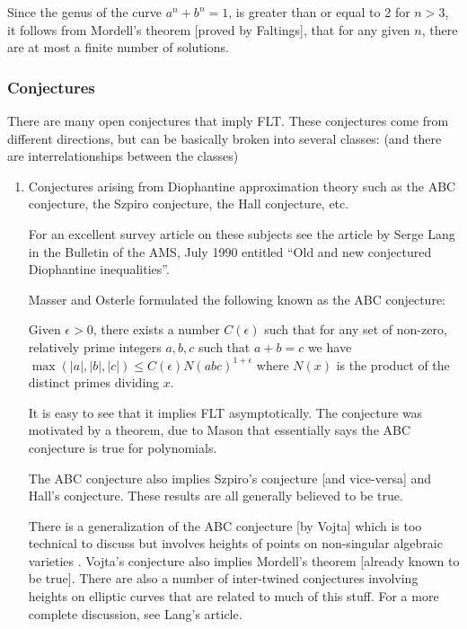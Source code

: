 {  Since the genus of the curve $a^n + b^n = 1$, is greater than or equal
  to 2 for $n > 3$, it follows from Mordell's theorem [proved by
  Faltings], that for any given $n$, there are at most a finite number
  of solutions.


  \subsubsection{Conjectures}

  There are many open conjectures that imply FLT. These conjectures come
  from different directions, but can be basically broken into several
  classes: (and there are interrelationships between the classes)

  \begin{enumerate}
    \item Conjectures arising from Diophantine approximation theory such
    as the ABC conjecture, the Szpiro conjecture, the Hall conjecture,
    etc.

    For an excellent survey article on these subjects see the article by
    Serge Lang in the Bulletin of the AMS, July 1990 entitled ``Old and
    new conjectured Diophantine inequalities''.

    Masser and Osterle formulated the following known as the ABC
    conjecture:

    Given $\epsilon > 0$, there exists a number $C(\epsilon)$ such that
    for any set of non-zero, relatively prime integers $a,b,c$ such that
    $a+b = c$ we have $\max( |a|, |b|, |c|) \leq C(\epsilon) N(abc)^{1 +
      \epsilon}$ where $N(x)$ is the product of the distinct primes
    dividing $x$.

    It is easy to see that it implies FLT asymptotically. The conjecture
    was motivated by a theorem, due to Mason that essentially says the
    ABC conjecture is true for polynomials.

    The ABC conjecture also implies Szpiro's conjecture [and vice-versa]
    and Hall's conjecture. These results are all generally believed to
    be true.

    There is a generalization of the ABC conjecture [by Vojta] which is
    too technical to discuss but involves heights of points on
    non-singular algebraic varieties . Vojta's conjecture also implies
    Mordell's theorem [already known to be true]. There are also a
    number of inter-twined conjectures involving heights on elliptic
    curves that are related to much of this stuff. For a more complete
    discussion, see Lang's article.


\end{enumerate}}
